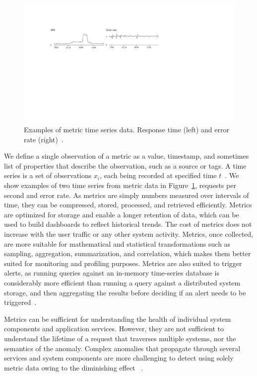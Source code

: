 \begin{figure}[!t]
\centerline{\includegraphics[width=1.0\textwidth]{gfx/chap2/rpsanderror.pdf}}
\caption{Examples of metric time series data. Response time (left) and error rate (right)~\cite{appoptics}.}
\label{fig:rpsanderror}
\end{figure}

We define a single observation of a metric as a value, timestamp, and sometimes list of properties that describe the observation, such as a source or tags. A time series is a set of observations $x_i$, each being recorded at specified time $t$~\cite{brockwell1991time}. We show examples of two time series from metric data in Figure~\ref{fig:rpsanderror}, requests per second and error rate. As metrics are simply numbers measured over intervals of time, they can be compressed, stored, processed, and retrieved efficiently. Metrics are optimized for storage and enable a longer retention of data, which can be used to build dashboards to reflect historical trends. The cost of metrics does not increase with the user traffic or any other system activity. Metrics, once collected, are more suitable for mathematical and statistical transformations such as sampling, aggregation, summarization, and correlation, which makes them better suited for monitoring and profiling purposes. Metrics are also suited to trigger alerts, as running queries against an in-memory time-series database is considerably more efficient than running a query against a distributed system storage, and then aggregating the results before deciding if an alert needs to be triggered~\cite{sridharan2018distributed,donut}.

Metrics can be sufficient for understanding the health of individual system components and application services. However, they are not sufficient to understand the lifetime of a request that traverses multiple systems, nor the semantics of the anomaly. Complex anomalies that propagate through several services and system components are more challenging to detect using solely metric data owing to the diminishing effect ~\cite{sridharan2018distributed,observability2020practical}.

